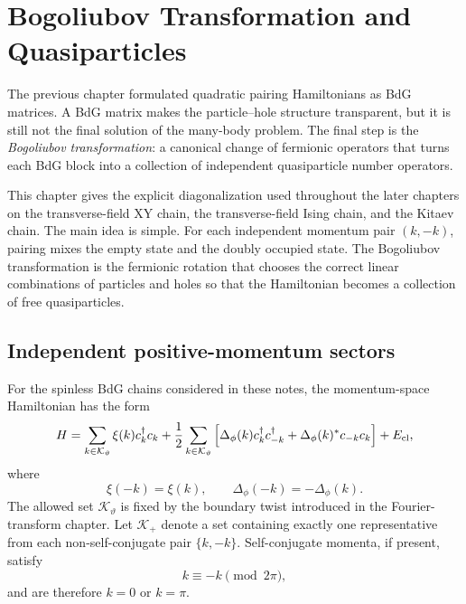 \chapter{Bogoliubov Transformation and Quasiparticles}
\label{chap:bogoliubov-transformation-quasiparticles}

The previous chapter formulated quadratic pairing Hamiltonians as BdG matrices.
A BdG matrix makes the particle--hole structure transparent, but it is still not
the final solution of the many-body problem.  The final step is the
\emph{Bogoliubov transformation}: a canonical change of fermionic operators that
turns each BdG block into a collection of independent quasiparticle number operators.

This chapter gives the explicit diagonalization used throughout the later
chapters on the transverse-field XY chain, the transverse-field Ising chain, and
the Kitaev chain.  The main idea is simple.  For each independent momentum pair
$(k,-k)$, pairing mixes the empty state and the doubly occupied state.  The
Bogoliubov transformation is the fermionic rotation that chooses the correct
linear combinations of particles and holes so that the Hamiltonian becomes a collection of free quasiparticles.

\section{Independent positive-momentum sectors}
\label{sec:bt-independent-momentum-sectors}

For the spinless BdG chains considered in these notes, the momentum-space
Hamiltonian has the form
\begin{equation}
\label{eq:bt-full-momentum-hamiltonian}
    H
    =
    \sum_{k\in\mathcal{K}_\vartheta}\xi(k)c_k^\dagger c_k
    +\frac12\sum_{k\in\mathcal{K}_\vartheta}
    \left[
        \Delta_\phi(k)c_k^\dagger c_{-k}^\dagger
        +\Delta_\phi(k)^*c_{-k}c_k
    \right]
    +E_{\rm cl},
\end{equation}
where
\begin{equation}
\label{eq:bt-even-xi-odd-gap}
    \xi(-k)=\xi(k),
    \qquad
    \Delta_\phi(-k)=-\Delta_\phi(k).
\end{equation}
The allowed set $\mathcal{K}_\vartheta$ is fixed by the boundary twist
introduced in the Fourier-transform chapter.  Let $\mathcal{K}_+$ denote a set
containing exactly one representative from each non-self-conjugate pair
$\{k,-k\}$.  Self-conjugate momenta, if present, satisfy
\begin{equation}
    k\equiv -k \pmod{2\pi},
\end{equation}
and are therefore $k=0$ or $k=\pi$.

